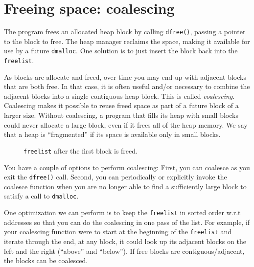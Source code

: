 \documentclass[a4paper,10pt]{article}
\newcommand{\comment}[1]{}
\begin{document}
\section{Freeing space: coalescing}
The program frees an allocated heap block by calling \texttt{dfree()}, passing a pointer
to the block to free.   The heap manager reclaims the space, making it available for use by a
future \texttt{dmalloc}.
One solution is to just insert the block back into the
\texttt{freelist}.

As blocks are allocate and freed, over time you may end up with adjacent blocks
that are both free.  In that case, it is often useful and/or necessary
to 
combine the adjacent blocks into a single contiguous heap block.
This is called {\it
  coalescing}.   
Coalescing makes it possible to reuse freed space as part of a future block of a larger size.
Without coalescing, a program that fills its heap with small blocks could never allocate a large block, even if it
frees all of the heap memory.   We say that a heap is ``fragmented'' if its space is available only in small blocks.




\begin{figure}[!ht]
\centering
{}\hspace{2mm}\hspace{1mm}
\caption{\texttt{freelist} after the first block is freed. }
\label{fig:free}
\end{figure}



You have a couple of options to perform coalescing: First, you can coalesce as
you exit the \texttt{dfree()} call. Second, you can periodically or
explicitly invoke the coalesce function when you are no longer able to
find a sufficiently large block to satisfy a call to \texttt{dmalloc}.

One optimization we can perform is to keep the \texttt{freelist} in sorted
order w.r.t addresses so that you can do the coalescing in one pass of the
list. For example, if your coalescing function were to start at the beginning of the
\texttt{freelist} and iterate through the end, at any block, it could look up
its adjacent blocks on the left and the right (``above'' and
``below'').   If free blocks are
contiguous/adjacent, the blocks can be coalesced. 
\end{document}
